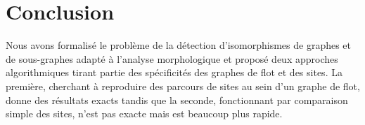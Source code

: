 \section{Conclusion}
Nous avons formalisé le problème de la détection d'isomorphismes de graphes et de sous-graphes adapté à l'analyse morphologique et proposé deux approches algorithmiques tirant partie des spécificités des graphes de flot et des sites.
La première, cherchant à reproduire des parcours de sites au sein d'un graphe de flot, donne des résultats exacts tandis que la seconde, fonctionnant par comparaison simple des sites, n'est pas exacte mais est beaucoup plus rapide.

